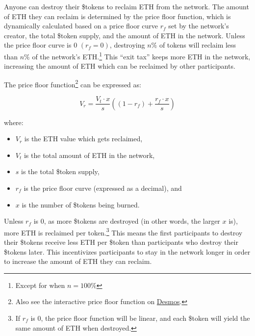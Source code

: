 \documentclass{article}
\begin{document}
Anyone can destroy their \$tokens to reclaim ETH from the network. The amount of ETH they can reclaim is determined by the price floor function, which is dynamically calculated based on a price floor curve $r_f$ set by the network's creator, the total \$token supply, and the amount of ETH in the network. Unless the price floor curve is 0 $(r_f = 0)$, destroying $n\%$ of tokens will reclaim less than $n\%$ of the network's ETH.\footnote{Except for when $n = 100\%$} This ``exit tax'' keeps more ETH in the network, increasing the amount of ETH which can be reclaimed by other participants.

The price floor function\footnote{Also see the interactive price floor function on \href{https://www.desmos.com/calculator/9pewqesyj5}{Desmos}.} can be expressed as:

\begin{equation}
  V_r = \frac{V_t \cdot x}{s}\left(\left(1-r_f\right)+\frac{r_f \cdot x}{s}\right)
\end{equation}

where:
\begin{itemize}
  \item $V_r$ is the ETH value which gets reclaimed,
  \item $V_t$ is the total amount of ETH in the network,
  \item $s$ is the total \$token supply,
  \item $r_f$ is the price floor curve (expressed as a decimal), and
  \item $x$ is the number of \$tokens being burned.
\end{itemize}

Unless $r_f$ is 0, as more \$tokens are destroyed (in other words, the larger $x$ is), more ETH is reclaimed per token.\footnote{If $r_f$ is 0, the price floor function will be linear, and each \$token will yield the same amount of ETH when destroyed.} This means the first participants to destroy their \$tokens receive less ETH per \$token than participants who destroy their \$tokens later. This incentivizes participants to stay in the network longer in order to increase the amount of ETH they can reclaim.
\end{document}
